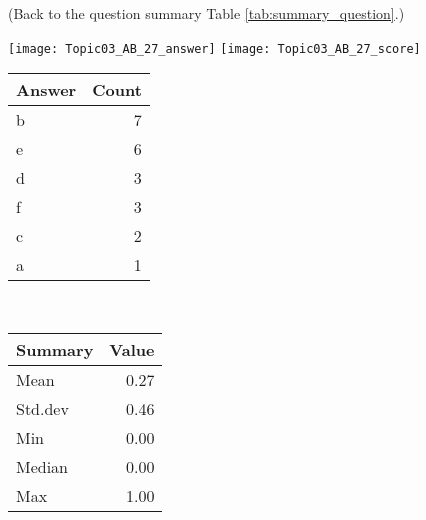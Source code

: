 \documentclass[12pt,english,nohyper]{tufte-handout}\usepackage[]{graphicx}\usepackage[]{color}
\begin{document}
 (Back to the question summary Table \ref{tab:summary_question}.)

\begin{center} \texttt{[image: Topic03\_AB\_27\_answer]} \texttt{[image: Topic03\_AB\_27\_score]} \end{center} 

\begin{center}%
\begin{tabular}{lr}
  \hline
Answer & Count \\ 
  \hline
b &   7 \\ 
  e &   6 \\ 
  d &   3 \\ 
  f &   3 \\ 
  c &   2 \\ 
  a &   1 \\ 
   \hline
\end{tabular}
~~~~~~~~%
\begin{tabular}{lr}
  \hline
Summary & Value \\ 
  \hline
Mean & 0.27 \\ 
  Std.dev & 0.46 \\ 
  Min & 0.00 \\ 
  Median & 0.00 \\ 
  Max & 1.00 \\ 
   \hline
\end{tabular}
\end{center}\newpage{}
\end{document}
